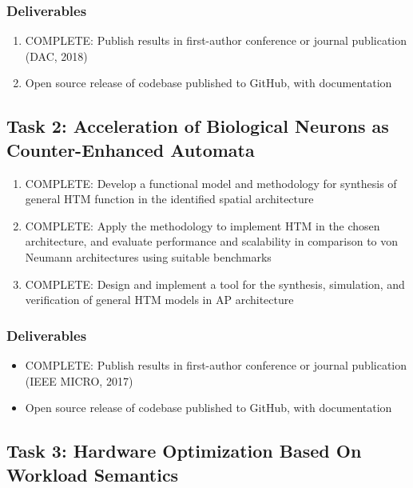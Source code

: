 \subsubsection{Deliverables}

\begin{enumerate}
    \item \textsc{COMPLETE}: Publish results in first-author conference or journal publication (DAC, 2018)
    \item Open source release of codebase published to GitHub, with documentation
\end{enumerate}

\subsection{Task 2: Acceleration of Biological Neurons as Counter-Enhanced Automata}

\begin{enumerate}
    \item \textsc{COMPLETE}: Develop a functional model and methodology for synthesis of general HTM function in the identified spatial architecture
    \item \textsc{COMPLETE}: Apply the methodology to implement HTM in the chosen architecture, and evaluate performance and scalability in comparison to von Neumann architectures using suitable benchmarks
    \item \textsc{COMPLETE}: Design and implement a tool for the synthesis, simulation, and verification of general HTM models in AP architecture
\end{enumerate}

\subsubsection{Deliverables}
\begin{itemize}
    \item \textsc{COMPLETE}: Publish results in first-author conference or journal publication (IEEE MICRO, 2017)
    \item Open source release of codebase published to GitHub, with documentation
\end{itemize}

\subsection{Task 3: Hardware Optimization Based On Workload Semantics}

